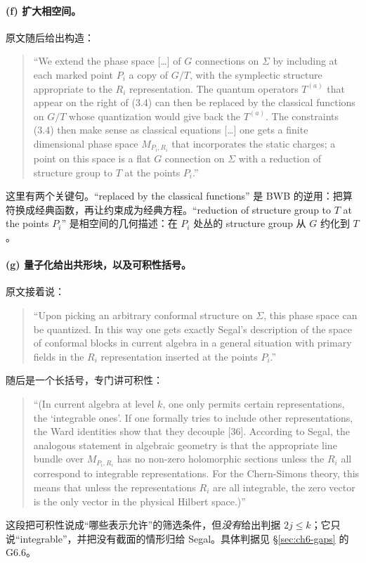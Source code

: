 \paragraph{(f) 扩大相空间。}原文随后给出构造：
\begin{quote}\small
“We extend the phase space [\dots] of $G$ connections on $\Sigma$ by including at each marked point $P_i$ a copy of $G/T$, with the symplectic structure appropriate to the $R_i$ representation. The quantum operators $T^{(a)}$ that appear on the right of (3.4) can then be replaced by the classical functions on $G/T$ whose quantization would give back the $T^{(a)}$. The constraints (3.4) then make sense as classical equations [\dots] one gets a finite dimensional phase space $M_{P_i,R_i}$ that incorporates the static charges; a point on this space is a flat $G$ connection on $\Sigma$ with a reduction of structure group to $T$ at the points $P_i$.” 
\end{quote}
这里有两个关键句。“replaced by the classical functions” 是 BWB 的逆用：把算符换成经典函数，再让约束成为经典方程。“reduction of structure group to $T$ at the points $P_i$” 是相空间的几何描述：在 $P_i$ 处丛的 structure group 从 $G$ 约化到 $T$。

\paragraph{(g) 量子化给出共形块，以及可积性括号。}原文接着说：
\begin{quote}\small
“Upon picking an arbitrary conformal structure on $\Sigma$, this phase space can be quantized. In this way one gets exactly Segal's description of the space of conformal blocks in current algebra in a general situation with primary fields in the $R_i$ representation inserted at the points $P_i$.” 
\end{quote}
随后是一个长括号，专门讲可积性：
\begin{quote}\small
“(In current algebra at level $k$, one only permits certain representations, the `integrable ones'. If one formally tries to include other representations, the Ward identities show that they decouple [36]. According to Segal, the analogous statement in algebraic geometry is that the appropriate line bundle over $M_{P_i,R_i}$ has no non-zero holomorphic sections unless the $R_i$ all correspond to integrable representations. For the Chern-Simons theory, this means that unless the representations $R_i$ are all integrable, the zero vector is the only vector in the physical Hilbert space.)” 
\end{quote}
这段把可积性说成“哪些表示允许”的筛选条件，但\emph{没有}给出判据 $2j\le k$；它只说“integrable”，并把没有截面的情形归给 Segal。具体判据见 \S\ref{sec:ch6-gaps} 的 G6.6。

